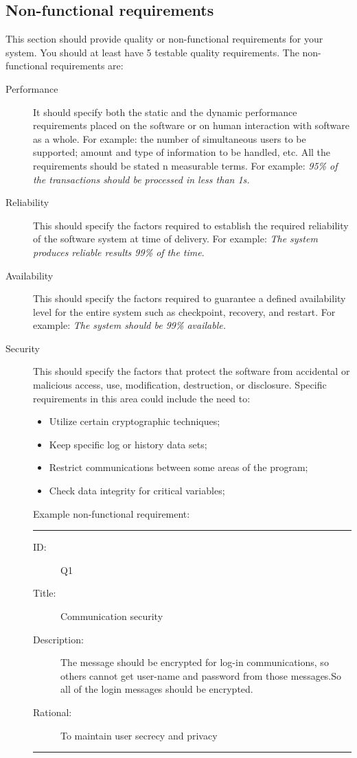 \subsection{Non-functional requirements} %
\label{sub:non_functional_requirements}
This section should provide quality or non-functional requirements for your system. You should at least have 5 testable quality requirements. The non-functional requirements are:
\begin{description}
	\item[Performance] It should specify both the static and the dynamic performance requirements placed on the software or on human interaction with software as a whole. For example: the number of simultaneous users to be supported; amount and type of information to be handled, etc. All the requirements should be stated n measurable terms. For example: \emph{95\% of the transactions should be processed in less than 1s.}

	\item[Reliability] This should specify the factors required to establish the required reliability of the software system at time of delivery. For example: \emph{The system produces reliable results 99\% of the time}.

	\item[Availability] This should specify the factors required to guarantee a defined availability level for the entire system such as checkpoint, recovery, and restart. For example: \emph{The system should be 99\% available.}

	\item[Security] This should specify the factors that protect the software from accidental or malicious access, use, modification, destruction, or disclosure. Specific requirements in this area could include the need to:
	\begin{itemize}
		\item Utilize certain cryptographic techniques;
		\item Keep specific log or history data sets;
		\item Restrict communications between some areas of the program;
		\item Check data integrity for critical variables;
	\end{itemize}

	Example non-functional requirement:
	\hrule
	\begin{description}
		\item[ID:] Q1
		\item[Title:] Communication security
		\item[Description:] The message should be encrypted for log-in communications, so others cannot get user-name and password from those messages.So all of the login messages should be encrypted.
		\item[Rational:] To maintain user secrecy and privacy
	\end{description}
	\hrule
\end{description}

